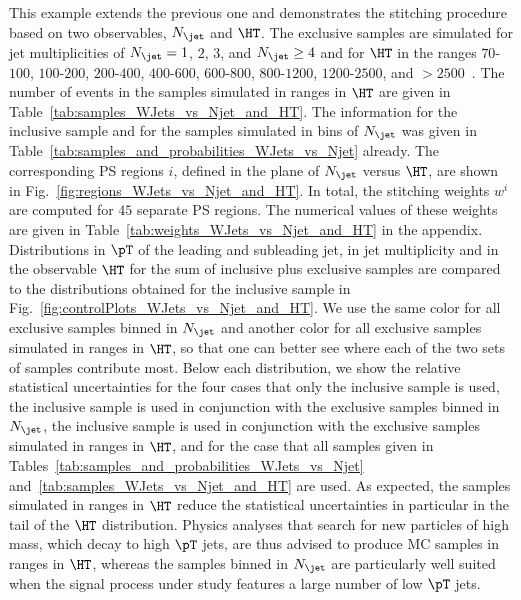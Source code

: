 This example extends the previous one and demonstrates the stitching procedure based on two observables, $N_{\jet}$ and $\HT$.
The exclusive samples are simulated for jet multiplicities of $N_{\jet} = 1$, $2$, $3$, and $N_{\jet} \geq 4$ 
and for $\HT$ in the ranges $70$-$100$, $100$-$200$, $200$-$400$, $400$-$600$, $600$-$800$, $800$-$1200$, $1200$-$2500$, and $> 2500$~\GeV.
The number of events in the samples simulated in ranges in $\HT$ are given in Table~\ref{tab:samples_WJets_vs_Njet_and_HT}.
The information for the inclusive sample and for the samples simulated in bins of $N_{\jet}$ was given in Table~\ref{tab:samples_and_probabilities_WJets_vs_Njet} already.
The corresponding PS regions $i$, defined in the plane of $N_{\jet}$ versus $\HT$, are shown in Fig.~\ref{fig:regions_WJets_vs_Njet_and_HT}.
In total, the stitching weights $w^{i}$ are computed for $45$ separate PS regions.
The numerical values of these weights are given in Table~\ref{tab:weights_WJets_vs_Njet_and_HT} in the appendix.
Distributions in $\pT$ of the leading and subleading jet,
in jet multiplicity and in the observable $\HT$ 
for the sum of inclusive plus exclusive samples are compared to the distributions obtained for the inclusive sample in Fig.~\ref{fig:controlPlots_WJets_vs_Njet_and_HT}.
We use the same color for all exclusive samples binned in $N_{\jet}$ and another color for all exclusive samples simulated in ranges in $\HT$,
so that one can better see where each of the two sets of samples contribute most.
Below each distribution, we show the relative statistical uncertainties for the four cases that
only the inclusive sample is used, the inclusive sample is used in conjunction with the exclusive samples binned in $N_{\jet}$,
the inclusive sample is used in conjunction with the exclusive samples simulated in ranges in $\HT$,
and for the case that all samples given in Tables~\ref{tab:samples_and_probabilities_WJets_vs_Njet} and~\ref{tab:samples_WJets_vs_Njet_and_HT} are used.
As expected, the samples simulated in ranges in $\HT$ reduce the statistical uncertainties in particular in the tail of the $\HT$ distribution.
Physics analyses that search for new particles of high mass, which decay to high $\pT$ jets, are thus advised to produce MC samples in ranges in $\HT$,
whereas the samples binned in $N_{\jet}$ are particularly well suited when the signal process under study features a large number of low $\pT$ jets.

